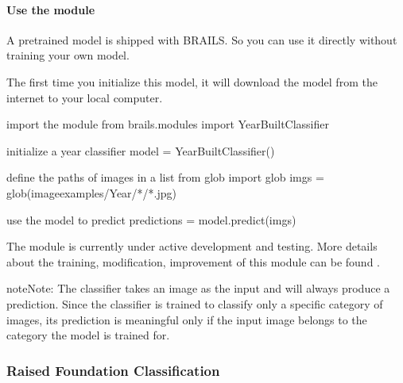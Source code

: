 \documentclass[letterpaper,10pt,english]{sphinxmanual}
\begin{document}
\paragraph{Use the module}
\label{\detokenize{common/user_manual/modules/yearClassifier:use-the-module}}
\sphinxAtStartPar
A pretrained model is shipped with BRAILS. So you can use it directly without training your own model.

\sphinxAtStartPar
The first time you initialize this model, it will download the model from the internet to your local computer.

\begin{sphinxVerbatim}[commandchars=\\\{\}]
\PYGZsh{} import the module
from brails.modules import YearBuiltClassifier

\PYGZsh{} initialize a year classifier
model = YearBuiltClassifier()

\PYGZsh{} define the paths of images in a list
from glob import glob
imgs = glob(\PYGZsq{}image\PYGZus{}examples/Year/*/*.jpg\PYGZsq{})

\PYGZsh{} use the model to predict
predictions = model.predict(imgs)
\end{sphinxVerbatim}

\sphinxAtStartPar
The module is currently under active development and testing.
More details about the training, modification, improvement of this module can be found .

\begin{sphinxadmonition}{note}{Note:}
\sphinxAtStartPar
The classifier takes an image as the input and will always produce a prediction.
Since the classifier is trained to classify only a specific category of images,
its prediction is meaningful only if the input image belongs to the category the model is trained for.
\end{sphinxadmonition}


\subsubsection{Raised Foundation Classification}
\label{\detokenize{common/user_manual/modules/foundationElevationClassifier:raised-foundation-classification}}\label{\detokenize{common/user_manual/modules/foundationElevationClassifier:lbl-foundationelevationclassifier}}\label{\detokenize{common/user_manual/modules/foundationElevationClassifier::doc}}
\end{document}

